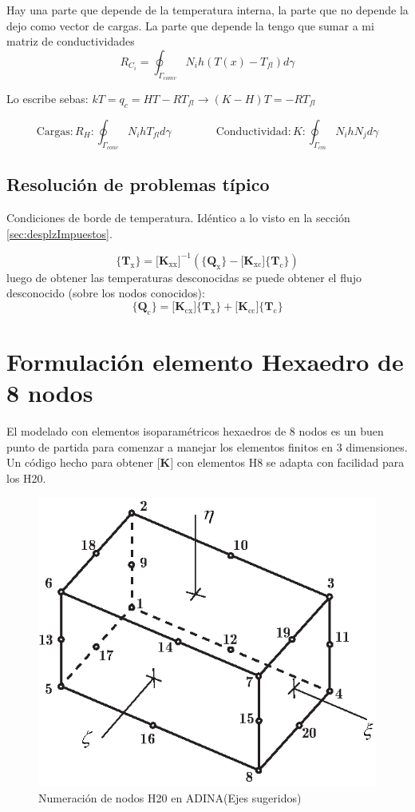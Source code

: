 \documentclass[11pt, a4paper,titlepage]{article}
\newcommand{\Adina}{{\sc ADINA}}
\newcommand{\Mme}[1]{\boldsymbol{[}\mathbf{#1} \boldsymbol{]}}
\newcommand{\Cme}[1]{\boldsymbol{\{ }\mathbf{#1} \boldsymbol{\}} }
\newcommand{\MK}{\Mme{K}}
\begin{document}
Hay una parte que depende de la temperatura interna, la parte que no depende la dejo como vector de cargas. La parte que depende la tengo que sumar a mi matriz de conductividades
\[
R_{C_{i}}=\oint_{\Gamma_{c o m v}} N_{i} h\left(T(x)-T_{f l}\right) d \gamma
\]

Lo escribe sebas: $kT=q_c = HT-RT_{fl} \longrightarrow (K-H)T = -R T_{fl}$

\[
\mathrm{Cargas:} R_{H} : \oint_{\Gamma_{c o n v}} N_{i} h T_{f l} d \gamma \qquad \qquad \mathrm{Conductividad:}  K : \oint_{\Gamma_{c m}} N_{i} h N_{j} d \gamma
\]


\subsection*{Resolución de problemas típico}

Condiciones de borde de temperatura. Idéntico a lo visto en la sección \ref{sec:desplzImpuestos}.

\[
\Cme{T_{\mathrm{x}}} = \Mme{K_{\mathrm{xx}}}^{-1} \left( \Cme{Q_\mathrm{x}}- \Mme{K_{\mathrm{xc}}}  \Cme{T_\mathrm{c}} \right)
\]
luego de obtener las temperaturas desconocidas se puede obtener el flujo desconocido (sobre los nodos conocidos):
\[
\Cme{Q_{\mathrm{c}}} = \Mme{K_{\mathrm{cx}}} \Cme{T_\mathrm{x}} + \Mme{K_{\mathrm{cc}}} \Cme{T_\mathrm{c}}  
\]





\section{Formulación elemento Hexaedro de 8 nodos}
\newcommand{\dof}{\ensuremath{\mathrm{dof}}}
El modelado con elementos isoparamétricos hexaedros de 8 nodos es un buen punto de partida para comenzar a manejar los elementos finitos en 3 dimensiones. Un código hecho para obtener $\MK$ con elementos H8 se adapta con facilidad para los H20.

\begin{figure}[htb!]
	\centering
	\includegraphics[width=.6\textwidth]{fig/H20numbering.eps}
	\caption{Numeración de nodos H20 en \Adina (Ejes sugeridos)}
	\label{fig:H20numbering}
\end{figure}
\end{document}
